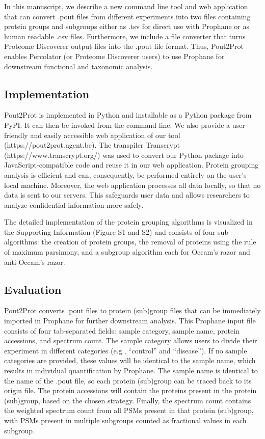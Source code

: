 In this manuscript, we describe a new command line tool and web
application that can convert .pout files from different experiments into
two files containing protein groups and subgroups either as .tsv for
direct use with Prophane or as human readable .csv files. Furthermore,
we include a file converter that turns Proteome Discoverer output files
into the .pout file format. Thus, Pout2Prot enables Percolator (or
Proteome Discoverer users) to use Prophane for downstream functional and
taxonomic analysis.

\hypertarget{implementation-3}{%
\subsection{Implementation}\label{implementation-3}}

Pout2Prot is implemented in Python and installable as a Python package
from PyPI. It can then be invoked from the command line. We also provide
a user-friendly and easily accessible web application of our tool
(https://pout2prot.ugent.be). The transpiler Transcrypt
(https://www.transcrypt.org/) was used to convert our Python package
into JavaScript-compatible code and reuse it in our web application.
Protein grouping analysis is efficient and can, consequently, be
performed entirely on the user's local machine. Moreover, the web
application processes all data locally, so that no data is sent to our
servers. This safeguards user data and allows researchers to analyze
confidential information more safely.

The detailed implementation of the protein grouping algorithms is
visualized in the Supporting Information (Figure S1 and S2) and consists
of four sub-algorithms: the creation of protein groups, the removal of
proteins using the rule of maximum parsimony, and a subgroup algorithm
each for Occam's razor and anti-Occam's razor.

\hypertarget{evaluation}{%
\subsection{Evaluation}\label{evaluation}}

Pout2Prot converts .pout files to protein (sub)group files that can be
immediately imported in Prophane for further downstream analysis. This
Prophane input file consists of four tab-separated fields: sample
category, sample name, protein accessions, and spectrum count. The
sample category allows users to divide their experiment in different
categories (e.g., ``control'' and ``disease''). If no sample categories
are provided, these values will be identical to the sample name, which
results in individual quantification by Prophane. The sample name is
identical to the name of the .pout file, so each protein (sub)group can
be traced back to its origin file. The protein accessions will contain
the proteins present in the protein (sub)group, based on the chosen
strategy. Finally, the spectrum count contains the weighted spectrum
count from all PSMs present in that protein (sub)group, with PSMs
present in multiple subgroups counted as fractional values in each
subgroup.


